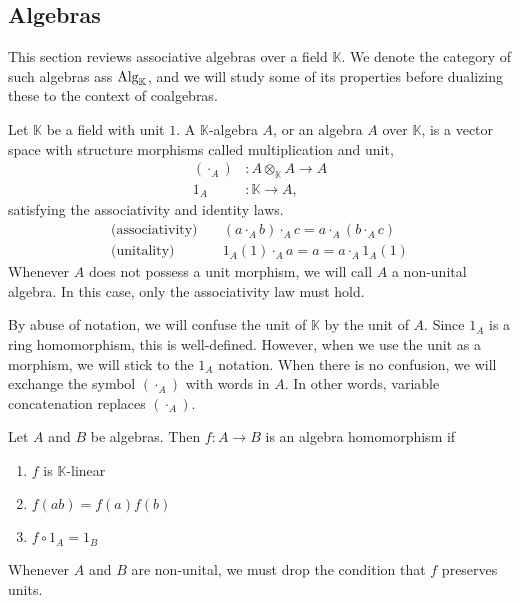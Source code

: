 \documentclass[../thesis.tex]{subfiles}
\begin{document}
    \subsection{Algebras}

            This section reviews associative algebras over a field $\mathbb{K}$. We denote the category of such algebras ass $\tt{Alg}_\mathbb{K}$, and we will study some of its properties before dualizing these to the context of coalgebras.
            
            \begin{definition}
                Let $\mathbb{K}$ be a field with unit $1$. A $\mathbb{K}$-algebra $A$, or an algebra $A$ over $\mathbb{K}$, is a vector space with structure morphisms called multiplication and unit,
                \begin{align*}
                    (\cdot_A) & : A\otimes_{\mathbb{K}}A \rightarrow A \\
                    1_A & : \mathbb{K} \rightarrow A,
                \end{align*}
                satisfying the associativity and identity laws. 
                \begin{align*}
                    \text{(associativity)}\quad & (a \cdot_A b) \cdot_A c = a \cdot_A (b \cdot_A c) \\
                    \text{(unitality)}\quad & 1_A(1) \cdot_A a = a = a \cdot_A 1_A(1)
                \end{align*}
                Whenever $A$ does not possess a unit morphism, we will call $A$ a non-unital algebra. In this case, only the associativity law must hold.
            \end{definition}

            By abuse of notation, we will confuse the unit of $\mathbb{K}$ by the unit of $A$. Since $1_A$ is a ring homomorphism, this is well-defined. However, when we use the unit as a morphism, we will stick to the $1_A$ notation. When there is no confusion, we will exchange the symbol $(\cdot_A)$ with words in $A$. In other words, variable concatenation replaces $(\cdot_A)$.

            \begin{definition}
                Let $A$ and $B$ be algebras. Then $f: A\rightarrow B$ is an algebra homomorphism if
                \begin{enumerate}
                    \item $f$ is $\mathbb{K}$-linear
                    \item $f(ab)=f(a)f(b)$
                    \item $f\circ 1_A = 1_B$
                \end{enumerate}
                Whenever $A$ and $B$ are non-unital, we must drop the condition that $f$ preserves units.
            \end{definition}
\end{document}
